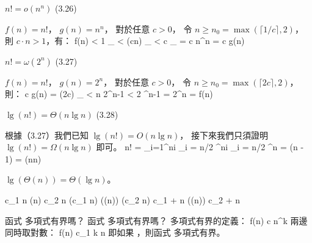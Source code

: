 \startitem
$n!=o(n^n)$ \hfill (3.26)
\stopitem

\startANSWER
$f(n)=n!$， $g(n)=n^n$，
對於任意 $c>0$，
令 $n \ge n_0 = \max(\lceil 1/c\rceil, 2)$，
則 $c\cdot n > 1$，有：
\startsplitformula\startmathalignment
{}\le f(n) \NC
< 1 \cdot {}_{} \NR
\NC \NC < (c\cdot n) \cdot {}_{} \NR
\NC \NC < c \cdot {}_{} \NR
\NC \NC = c n^n \NR
\NC \NC = c g(n) \NR
\stopmathalignment\stopsplitformula
\stopANSWER

\startitem
$n!=\omega(2^n)$ \hfill (3.27)
\stopitem

\startANSWER
$f(n)=n!$， $g(n)=2^n$，
對於任意 $c>0$，
令 $n \ge n_0 = \max(\lceil 2c \rceil, 2)$，
則：
\startsplitformula\startmathalignment
{} \le c g(n) \NC
= (2c) \cdot {}_{} \NR
\NC \NC < n 2^{n-1} \NR
\NC \NC < 2 ^{n-1} \NR
\NC \NC = 2^n \NR
\NC \NC = f(n) \NR
\stopmathalignment\stopsplitformula
\stopANSWER

\startitem
$\lg(n!)=\Theta(n\lg n)$ \hfill (3.28)
\stopitem

\startANSWER
根據（3.27）我們已知 $\lg(n!)=O(n\lg n)$，
接下來我們只須證明 $\lg(n!)=\Omega(n\lg n)$ 即可。
\startsplitformula\startmathalignment
\NC \lg n! \NC = \sum_{i=1}^{n}\lg i \NR
\NC \NC \ge \sum_{i = \lceil n/2 \rceil}^{n}\lg i \NR
\NC \NC \ge \sum_{i = \lceil n/2 \rceil}^{n} \lg {} \NR
\NC \NC \ge {}\lg {} \NR
\NC \NC = (\lg n - 1) \NR
\NC \NC = \Omega(n\lg n) \NR
\stopmathalignment\stopsplitformula
\stopANSWER
\stopitem

\startitem
$\lg(\Theta(n)) = \Theta(\lg n)$。
\stopitem

\startANSWER
\startsplitformula\startmathalignment[n=3,align={right,middle,left}]
\NC c_1 n \le \NC \Theta(n) \NC \le c_2 n \NR
\NC \lg(c_1 n) \le \NC \lg(\Theta(n)) \NC \le \lg(c_2 n) \NR
\NC \lg c_1 + \lg n \le \NC \lg(\Theta(n)) \NC \le \lg c_2 + \lg n \NR
\stopmathalignment\stopsplitformula
\stopANSWER

\stopigBase
\stopEXERCISE

\startEXERCISE\DIFFICULT
函式  多項式有界嗎？
函式  多項式有界嗎？
\stopEXERCISE
\startANSWER
多項式有界的定義：
\startformula
 f(n) \leq c n^k
\stopformula
兩邊同時取對數：
\startformula
 \lg f(n) \leq c_1 k \lg n
\stopformula
即如果 ，則函式  多項式有界。


